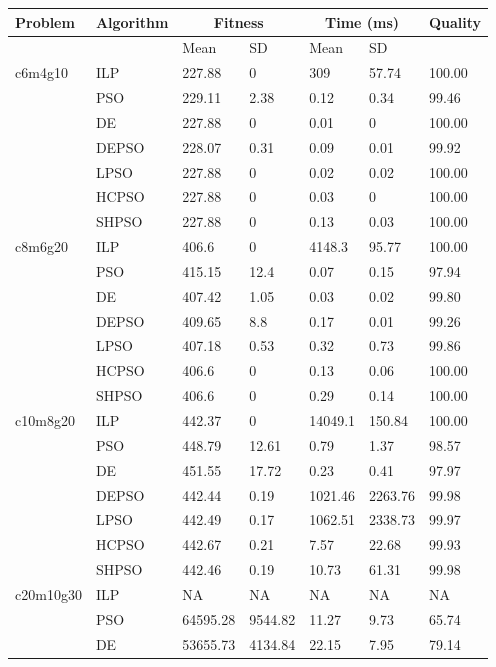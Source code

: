 \begin{table}[]
\small
\begin{tabular}{@{}lllllll@{}}
\toprule
Problem & Algorithm & \multicolumn{2}{c}{Fitness} & \multicolumn{2}{c}{Time (ms)} & Quality \\ \midrule
 &  & Mean & SD & Mean & SD &  \\ \midrule
c6m4g10 & ILP & 227.88 & 0 & 309 & 57.74 & 100.00  \\
 & PSO & 229.11 & 2.38 & 0.12 & 0.34 & 99.46  \\
 & DE & 227.88 & 0 & 0.01 & 0 & 100.00  \\
 & DEPSO & 228.07 & 0.31 & 0.09 & 0.01 & 99.92  \\
 & LPSO & 227.88 & 0 & 0.02 & 0.02 & 100.00  \\
 & HCPSO & 227.88 & 0 & 0.03 & 0 & 100.00  \\
 & SHPSO & 227.88 & 0 & 0.13 & 0.03 & 100.00  \\
c8m6g20 & ILP & 406.6 & 0 & 4148.3 & 95.77 & 100.00  \\
 & PSO & 415.15 & 12.4 & 0.07 & 0.15 & 97.94  \\
 & DE & 407.42 & 1.05 & 0.03 & 0.02 & 99.80  \\
 & DEPSO & 409.65 & 8.8 & 0.17 & 0.01 & 99.26  \\
 & LPSO & 407.18 & 0.53 & 0.32 & 0.73 & 99.86  \\
 & HCPSO & 406.6 & 0 & 0.13 & 0.06 & 100.00  \\
 & SHPSO & 406.6 & 0 & 0.29 & 0.14 & 100.00  \\
c10m8g20 & ILP & 442.37 & 0 & 14049.1 & 150.84 & 100.00  \\
 & PSO & 448.79 & 12.61 & 0.79 & 1.37 & 98.57  \\
 & DE & 451.55 & 17.72 & 0.23 & 0.41 & 97.97  \\
 & DEPSO & 442.44 & 0.19 & 1021.46 & 2263.76 & 99.98  \\
 & LPSO & 442.49 & 0.17 & 1062.51 & 2338.73 & 99.97  \\
 & HCPSO & 442.67 & 0.21 & 7.57 & 22.68 & 99.93  \\
 & SHPSO & 442.46 & 0.19 & 10.73 & 61.31 & 99.98  \\
c20m10g30 & ILP & NA & NA & NA & NA & NA \\
 & PSO & 64595.28 & 9544.82 & 11.27 & 9.73 & 65.74  \\
 & DE & 53655.73 & 4134.84 & 22.15 & 7.95 & 79.14  \\

\end{tabular}
\end{table}
